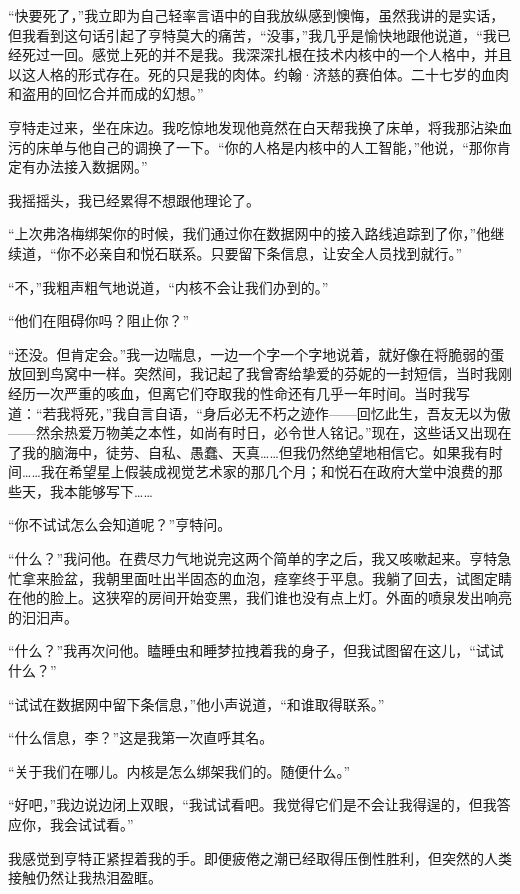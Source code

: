\documentclass[AutoFakeBold=true]{book}
\begin{document}
``快要死了，''我立即为自己轻率言语中的自我放纵感到懊悔，虽然我讲的是实话，但我看到这句话引起了亨特莫大的痛苦，``没事，''我几乎是愉快地跟他说道，``我已经死过一回。感觉上死的并不是我。我深深扎根在技术内核中的一个人格中，并且以这人格的形式存在。死的只是我的肉体。约翰·济慈的赛伯体。二十七岁的血肉和盗用的回忆合并而成的幻想。''

亨特走过来，坐在床边。我吃惊地发现他竟然在白天帮我换了床单，将我那沾染血污的床单与他自己的调换了一下。``你的人格是内核中的人工智能，''他说，``那你肯定有办法接入数据网。''

我摇摇头，我已经累得不想跟他理论了。

``上次弗洛梅绑架你的时候，我们通过你在数据网中的接入路线追踪到了你，''他继续道，``你不必亲自和悦石联系。只要留下条信息，让安全人员找到就行。''

``不，''我粗声粗气地说道，``内核不会让我们办到的。''

``他们在阻碍你吗？阻止你？''

``还没。但肯定会。''我一边喘息，一边一个字一个字地说着，就好像在将脆弱的蛋放回到鸟窝中一样。突然间，我记起了我曾寄给挚爱的芬妮的一封短信，当时我刚经历一次严重的咳血，但离它们夺取我的性命还有几乎一年时间。当时我写道：{\kaishu ``若我将死，''}我自言自语，{\kaishu ``身后必无不朽之迹作——回忆此生，吾友无以为傲——然余热爱万物美之本性，如尚有时日，必令世人铭记。''}现在，这些话又出现在了我的脑海中，徒劳、自私、愚蠢、天真……但我仍然绝望地相信它。如果我有时间……我在希望星上假装成视觉艺术家的那几个月；和悦石在政府大堂中浪费的那些天，我本能够写下……

``你不试试怎么会知道呢？''亨特问。

``什么？''我问他。在费尽力气地说完这两个简单的字之后，我又咳嗽起来。亨特急忙拿来脸盆，我朝里面吐出半固态的血泡，痉挛终于平息。我躺了回去，试图定睛在他的脸上。这狭窄的房间开始变黑，我们谁也没有点上灯。外面的喷泉发出响亮的汩汩声。

``什么？''我再次问他。瞌睡虫和睡梦拉拽着我的身子，但我试图留在这儿，``试试什么？''

``试试在数据网中留下条信息，''他小声说道，``和谁取得联系。''

``什么信息，李？''这是我第一次直呼其名。

``关于我们在哪儿。内核是怎么绑架我们的。随便什么。''

``好吧，''我边说边闭上双眼，``我试试看吧。我觉得它们是不会让我得逞的，但我答应你，我会试试看。''

我感觉到亨特正紧捏着我的手。即便疲倦之潮已经取得压倒性胜利，但突然的人类接触仍然让我热泪盈眶。
\end{document}
